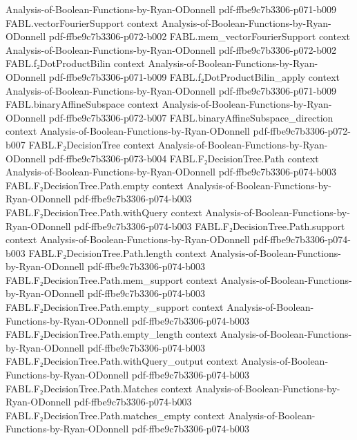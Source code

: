 \begin{theorem}
  {Analysis-of-Boolean-Functions-by-Ryan-ODonnell}
  {pdf-ffbe9c7b3306-p071-b009}
\proofstep
  {FABL.vectorFourierSupport}
  {context}
  {Analysis-of-Boolean-Functions-by-Ryan-ODonnell}
  {pdf-ffbe9c7b3306-p072-b002}
\proofstep
  {FABL.mem_vectorFourierSupport}
  {context}
  {Analysis-of-Boolean-Functions-by-Ryan-ODonnell}
  {pdf-ffbe9c7b3306-p072-b002}
\proofstep
  {FABL.f₂DotProductBilin}
  {context}
  {Analysis-of-Boolean-Functions-by-Ryan-ODonnell}
  {pdf-ffbe9c7b3306-p071-b009}
\proofstep
  {FABL.f₂DotProductBilin_apply}
  {context}
  {Analysis-of-Boolean-Functions-by-Ryan-ODonnell}
  {pdf-ffbe9c7b3306-p071-b009}
\proofstep
  {FABL.binaryAffineSubspace}
  {context}
  {Analysis-of-Boolean-Functions-by-Ryan-ODonnell}
  {pdf-ffbe9c7b3306-p072-b007}
\proofstep
  {FABL.binaryAffineSubspace_direction}
  {context}
  {Analysis-of-Boolean-Functions-by-Ryan-ODonnell}
  {pdf-ffbe9c7b3306-p072-b007}
\proofstep
  {FABL.F₂DecisionTree}
  {context}
  {Analysis-of-Boolean-Functions-by-Ryan-ODonnell}
  {pdf-ffbe9c7b3306-p073-b004}
\proofstep
  {FABL.F₂DecisionTree.Path}
  {context}
  {Analysis-of-Boolean-Functions-by-Ryan-ODonnell}
  {pdf-ffbe9c7b3306-p074-b003}
\proofstep
  {FABL.F₂DecisionTree.Path.empty}
  {context}
  {Analysis-of-Boolean-Functions-by-Ryan-ODonnell}
  {pdf-ffbe9c7b3306-p074-b003}
\proofstep
  {FABL.F₂DecisionTree.Path.withQuery}
  {context}
  {Analysis-of-Boolean-Functions-by-Ryan-ODonnell}
  {pdf-ffbe9c7b3306-p074-b003}
\proofstep
  {FABL.F₂DecisionTree.Path.support}
  {context}
  {Analysis-of-Boolean-Functions-by-Ryan-ODonnell}
  {pdf-ffbe9c7b3306-p074-b003}
\proofstep
  {FABL.F₂DecisionTree.Path.length}
  {context}
  {Analysis-of-Boolean-Functions-by-Ryan-ODonnell}
  {pdf-ffbe9c7b3306-p074-b003}
\proofstep
  {FABL.F₂DecisionTree.Path.mem_support}
  {context}
  {Analysis-of-Boolean-Functions-by-Ryan-ODonnell}
  {pdf-ffbe9c7b3306-p074-b003}
\proofstep
  {FABL.F₂DecisionTree.Path.empty_support}
  {context}
  {Analysis-of-Boolean-Functions-by-Ryan-ODonnell}
  {pdf-ffbe9c7b3306-p074-b003}
\proofstep
  {FABL.F₂DecisionTree.Path.empty_length}
  {context}
  {Analysis-of-Boolean-Functions-by-Ryan-ODonnell}
  {pdf-ffbe9c7b3306-p074-b003}
\proofstep
  {FABL.F₂DecisionTree.Path.withQuery_output}
  {context}
  {Analysis-of-Boolean-Functions-by-Ryan-ODonnell}
  {pdf-ffbe9c7b3306-p074-b003}
\proofstep
  {FABL.F₂DecisionTree.Path.Matches}
  {context}
  {Analysis-of-Boolean-Functions-by-Ryan-ODonnell}
  {pdf-ffbe9c7b3306-p074-b003}
\proofstep
  {FABL.F₂DecisionTree.Path.matches_empty}
  {context}
  {Analysis-of-Boolean-Functions-by-Ryan-ODonnell}
  {pdf-ffbe9c7b3306-p074-b003}

\end{theorem}
